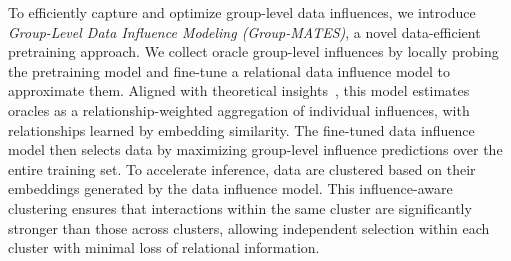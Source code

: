 





To efficiently capture and optimize group-level data influences, we introduce \textit{Group-Level Data Influence Modeling (Group-MATES)}, a novel data-efficient pretraining approach.
We collect oracle group-level influences by locally probing the pretraining model and fine-tune a relational data influence model to approximate them. Aligned with theoretical insights~\cite{wang2024capturing}, this model estimates oracles as a relationship-weighted aggregation of individual influences, with relationships learned by embedding similarity. 
The fine-tuned data influence model then selects data by maximizing group-level influence predictions over the entire training set.
To accelerate inference, data are clustered based on their embeddings generated by the data influence model. 
This influence-aware clustering ensures that interactions within the same cluster are significantly stronger than those across clusters, allowing independent selection within each cluster with minimal loss of relational information.
 
